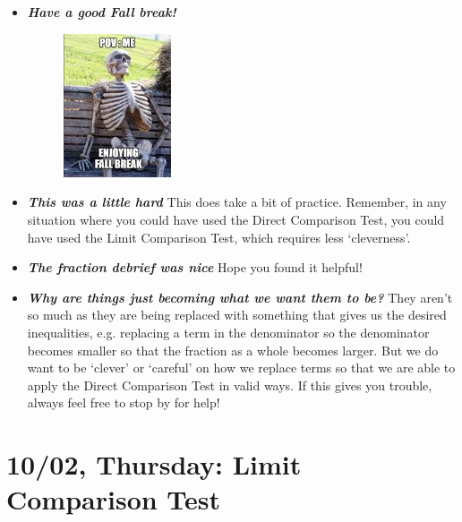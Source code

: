 \documentclass[11pt,letterpaper]{article}
\begin{document}
\begin{itemize}
\item {\bfseries\itshape Have a good Fall break!} 
	\begin{figure}[H]
	\centering
	\includegraphics[width=0.3\textwidth]{images/fallbreak.jpeg}
	\end{figure}

\item {\bfseries\itshape This was a little hard} This does take a bit of practice. Remember, in any situation where you could have used the Direct Comparison Test, you could have used the Limit Comparison Test, which requires less `cleverness'. 

\item {\bfseries\itshape The fraction debrief was nice} Hope you found it helpful!

\item {\bfseries\itshape Why are things just becoming what we want them to be?} They aren't so much as they are being replaced with something that gives us the desired inequalities, e.g. replacing a term in the denominator so the denominator becomes smaller so that the fraction as a whole becomes larger. But we do want to be `clever' or `careful' on how we replace terms so that we are able to apply the Direct Comparison Test in valid ways. If this gives you trouble, always feel free to stop by for help!
\end{itemize}

\newpage
\section*{10/02, Thursday: Limit Comparison Test\label{10-02}}
\end{document}
